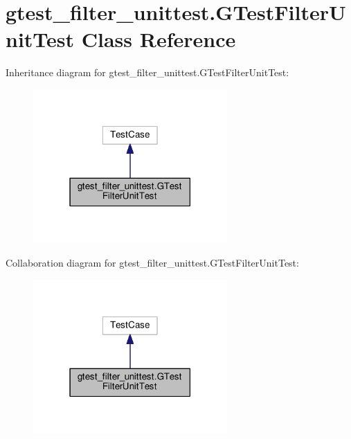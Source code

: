 \hypertarget{classgtest__filter__unittest_1_1GTestFilterUnitTest}{}\section{gtest\+\_\+filter\+\_\+unittest.\+G\+Test\+Filter\+Unit\+Test Class Reference}
\label{classgtest__filter__unittest_1_1GTestFilterUnitTest}


Inheritance diagram for gtest\+\_\+filter\+\_\+unittest.\+G\+Test\+Filter\+Unit\+Test\+:\nopagebreak
\begin{figure}[H]
\begin{center}
\leavevmode
\includegraphics[width=210pt]{classgtest__filter__unittest_1_1GTestFilterUnitTest__inherit__graph}
\end{center}
\end{figure}


Collaboration diagram for gtest\+\_\+filter\+\_\+unittest.\+G\+Test\+Filter\+Unit\+Test\+:\nopagebreak
\begin{figure}[H]
\begin{center}
\leavevmode
\includegraphics[width=210pt]{classgtest__filter__unittest_1_1GTestFilterUnitTest__coll__graph}
\end{center}
\end{figure}
